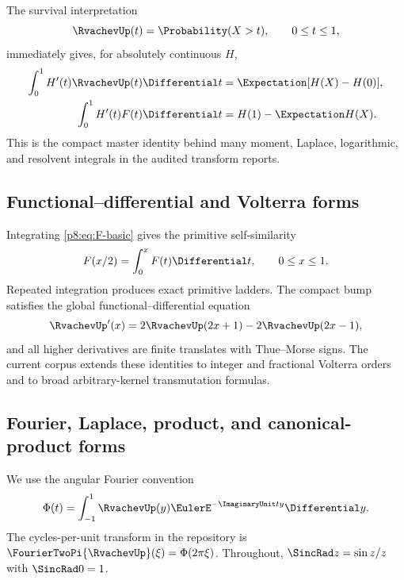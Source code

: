 \documentclass[11pt]{article}
\theoremstyle{definition}
\theoremstyle{remark}
\begin{document}
The survival interpretation
\begin{equation}
 \RvachevUp(t)=\Probability(X>t),\qquad 0\le t\le1,                    \label{p8:eq:survival-probability}
\end{equation}
immediately gives, for absolutely continuous $H$,
\begin{align}
 \int_0^1H'(t)\RvachevUp(t)\Differential t
   &=\Expectation[H(X)-H(0)],                                      \label{p8:eq:master-survival}\\
 \int_0^1H'(t)F(t)\Differential t
   &=H(1)-\Expectation H(X).                                       \label{p8:eq:master-cdf}
\end{align}
This is the compact master identity behind many moment, Laplace, logarithmic,
and resolvent integrals in the audited transform reports.

\subsection{Functional--differential and Volterra forms}

\baseline Integrating \eqref{p8:eq:F-basic} gives the primitive self-similarity
\begin{equation}
 F(x/2)=\int_0^xF(t)\Differential t,
 \qquad 0\le x\le1.                                     \label{p8:eq:volterra-basic}
\end{equation}
Repeated integration produces exact primitive ladders.  The compact bump
satisfies the global functional--differential equation
\begin{equation}
 \RvachevUp'(x)=2\RvachevUp(2x+1)-2\RvachevUp(2x-1),                         \label{p8:eq:up-differential}
\end{equation}
and all higher derivatives are finite translates with Thue--Morse signs.
The current corpus extends these identities to integer and fractional
Volterra orders and to broad arbitrary-kernel transmutation formulas.

\subsection{Fourier, Laplace, product, and canonical-product forms}

We use the angular Fourier convention
\begin{equation}
 \Phi(t)=\int_{-1}^{1}\RvachevUp(y)\EulerE^{-\ImaginaryUnit ty}\Differential y.           \label{p8:eq:Phi-definition}
\end{equation}
The cycles-per-unit transform in the repository is
$\FourierTwoPi{\RvachevUp}(\xi)=\Phi(2\pi\xi)$.  Throughout,
$\SincRad z=\sin z/z$ with $\SincRad0=1$.
\end{document}
